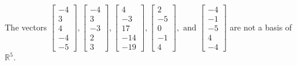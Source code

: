 \begin{exercise}
\begin{exerciseStatement}
  \end{exerciseStatement}
  \begin{exerciseAnswer}
   The vectors \(\left[\begin{array}{r}
-4 \\
3 \\
4 \\
-4 \\
-5
\end{array}\right] , \left[\begin{array}{r}
-4 \\
3 \\
-3 \\
2 \\
3
\end{array}\right] , \left[\begin{array}{r}
4 \\
-3 \\
17 \\
-14 \\
-19
\end{array}\right] , \left[\begin{array}{r}
2 \\
-5 \\
0 \\
-1 \\
4
\end{array}\right] , \text{ and } \left[\begin{array}{r}
-4 \\
-1 \\
-5 \\
4 \\
-4
\end{array}\right]\) 
  	 are not  a basis of \(\mathbb{R}^5\).
  


  \end{exerciseAnswer}
\end{exercise}